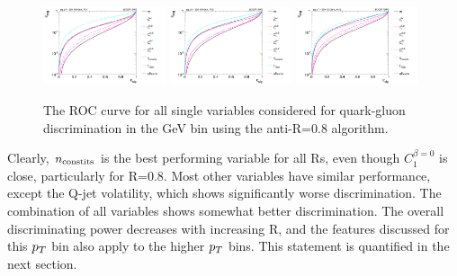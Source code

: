 \begin{figure}
\begin{center}
\includegraphics[width=0.32\textwidth]{./Figures/QGTagging/pT300/AKtR04/Rocs_1D_single.png}
\includegraphics[width=0.32\textwidth]{./Figures/QGTagging/pT300/AKtR08/Rocs_1D_single.png}
\includegraphics[width=0.32\textwidth]{./Figures/QGTagging/pT300/AKtR12/Rocs_1D_single.png}
\caption{The ROC curve for all single variables considered for quark-gluon discrimination in the  GeV bin using the anti-\kT R=0.8 algorithm.}
\label{fig:qg_pt300_single}
\end{center}
\end{figure}
Clearly, $n_{\rm constits}$ is the best performing variable for all Rs, even though $C_1^{\beta=0}$ is close, particularly
for R=0.8. Most other variables have similar performance, except the Q-jet volatility, which shows significantly worse
discrimination. The combination of all variables shows somewhat better discrimination. The overall discriminating 
power decreases with increasing R, and the features discussed for this $p_T$ bin also apply to the higher
$p_T$ bins. This statement is quantified in the next section. 



